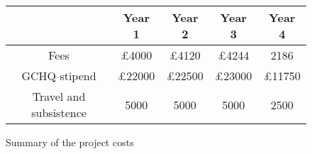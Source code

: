 \documentclass[10pt]{article}
\begin{document}
\begin{figure}[h!t]
\begin{center}
\begin{tabular}{|c|c|c|c|c|}
\hline 
& {\bf Year 1} &{\bf Year 2}&{\bf Year 3}&{\bf Year 4}\\
\hline
Fees & £4000 & £4120 & £4244 & 2186 \\
\hline
GCHQ stipend & £22000 & £22500 & £23000 & £11750 \\
\hline
Travel and subsistence & 5000 & 5000 & 5000 & 2500 \\
\hline
\end{tabular}
\end{center}
\caption{Summary of the project costs}
\label{fig:costs}
\end{figure}

%
%
%
%
\small


\end{document}
